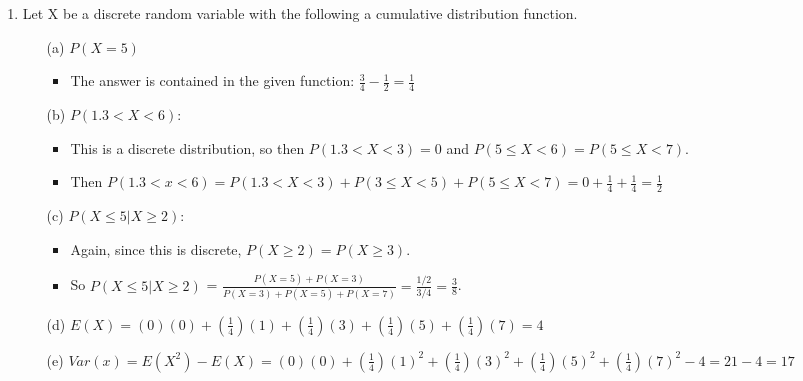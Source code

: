\documentclass{article}
\begin{document}
\begin{enumerate}
\item Let X be a discrete random variable with the following a cumulative distribution function.
    \begin{itemize}
    \item [(a)] $P(X = 5)$
        \begin{itemize}
        \item The answer is contained in the given function: $\frac{3}{4} - \frac{1}{2} = \frac{1}{4}$
        \end{itemize}
    \item [(b)] $P(1.3 < X < 6)$:
        \begin{itemize}
        \item This is a discrete distribution, so then $P(1.3 < X < 3) = 0$ and $P(5 \leq X < 6) = P(5 \leq X < 7)$.
        \item Then $P(1.3 < x < 6) = P(1.3 < X < 3) + P(3 \leq X < 5) + P(5 \leq X < 7) = 0 + \frac{1}{4} + \frac{1}{4} = \frac{1}{2}$
        \end{itemize}
    \item [(c)] $P(X \le 5|X \ge 2)$:
        \begin{itemize}
        \item Again, since this is discrete, $P(X \geq 2) = P(X \geq 3)$.
        \item So $P(X \le 5|X \ge 2)$ = $\frac{P(X = 5) + P(X = 3)}{P(X = 3) + P(X = 5) + P(X = 7)} = \frac{1/2}{3/4} = \frac{3}{8}$.
        \end{itemize}
    \item [(d)] $E(X) = (0)(0) + (\frac{1}{4})(1) + (\frac{1}{4})(3) + (\frac{1}{4})(5) + (\frac{1}{4})(7) = 4$
    \item [(e)] $Var(x) = E(X^2) - E(X) = (0)(0) + (\frac{1}{4})(1)^2 + (\frac{1}{4})(3)^2 + (\frac{1}{4})(5)^2 + (\frac{1}{4})(7)^2  - 4 = 21 - 4 = 17$
    \end{itemize}


\end{enumerate}
\end{document}
